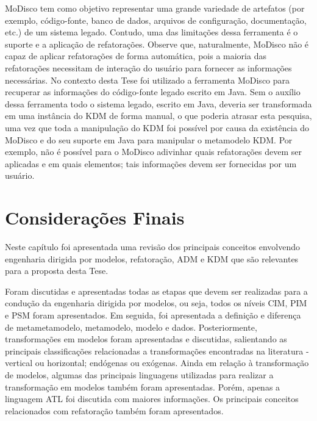 MoDisco tem como objetivo representar uma grande variedade de artefatos (por exemplo, código-fonte, banco de dados, arquivos de configuração, documentação, etc.) de um sistema legado. Contudo, uma das limitações dessa ferramenta é o suporte e a aplicação de refatorações. Observe que, naturalmente, MoDisco não é capaz de aplicar refatorações de forma automática, pois a maioria das refatorações necessitam de interação do usuário para fornecer as informações necessárias. No contexto desta Tese foi utilizado a ferramenta MoDisco para recuperar as informações do código-fonte legado escrito em Java. Sem o auxílio dessa ferramenta todo o sistema legado, escrito em Java, deveria ser transformada em uma instância do KDM de forma manual, o que poderia atrasar esta pesquisa, uma vez que toda a manipulação do KDM foi possível por causa da existência do MoDisco e do seu suporte em Java para manipular o metamodelo KDM. Por exemplo, não é possível para o MoDisco adivinhar quais refatorações devem ser aplicadas e em quais elementos; tais informações devem ser fornecidas por um usuário.




\section{Considerações Finais}\label{capitulobaclCOnsideracoesFinais}

Neste capítulo foi apresentada uma revisão dos principais conceitos envolvendo engenharia dirigida por modelos, refatoração, ADM e KDM que são relevantes para a proposta desta Tese. 

Foram discutidas e apresentadas todas as etapas que devem ser realizadas para a condução da engenharia dirigida por modelos, ou seja, todos os níveis CIM, PIM e PSM foram apresentados. Em seguida, foi apresentada a definição e diferença de metametamodelo, metamodelo, modelo e dados. Posteriormente, transformações em modelos foram apresentadas e discutidas, salientando as principais classificações relacionadas a transformações encontradas na literatura - vertical ou horizontal; endógenas ou exógenas. Ainda em relação à transformação de modelos, algumas das principais linguagens utilizadas para realizar a transformação em modelos também foram apresentadas. Porém, apenas a linguagem ATL foi discutida com maiores informações. Os principais conceitos relacionados com refatoração também foram apresentados.


